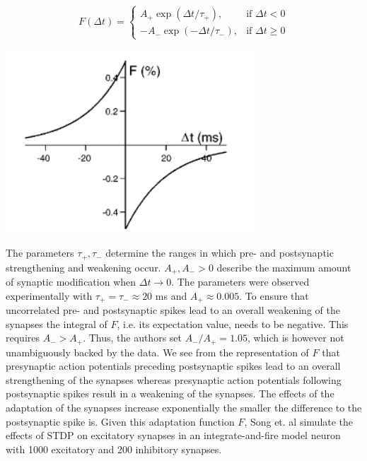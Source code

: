 \begin{minipage}{0.5\textwidth}
	$$F(\Delta t ) = \begin{cases}
	A_+ \exp(\Delta t/\tau_+), & \text{if } \Delta t < 0 \\
	- A_- \exp(-\Delta t/\tau_-), & \text{if } \Delta t \geq 0
	\end{cases}$$
\end{minipage}
\begin{minipage}[c]{0.5\textwidth}
	\centering
	\includegraphics[width=0.7\textwidth]{CN1}
\end{minipage}
The parameters $\tau_+, \tau_-$ determine the ranges in which pre- and postsynaptic strengthening and weakening occur. $A_+, A_- >0$ describe the maximum amount of synaptic modification when $\Delta t \rightarrow 0$. The parameters were observed experimentally with $\tau_+ = \tau_- \approx  20 $ ms and $A_+ \approx 0.005$. To ensure that uncorrelated pre- and postsynaptic spikes lead to an overall weakening of the synapses the integral of $F$, i.e. its expectation value, needs to be negative. This requires $A_->A_+$. Thus, the authors set $A_-/A_+ = 1.05$, which is however not unambiguously backed by the data.
We see from the representation of $F$ that presynaptic action potentials preceding postsynaptic spikes lead to an overall strengthening of the synapses whereas presynaptic action potentials following postsynaptic spikes result in a weakening of the synapses. The effects of the adaptation of the synapses increase exponentially the smaller the difference to the postsynaptic spike is. 
\newline \newline 
Given this adaptation function $F$, Song et. al \cite{article} simulate the effects of STDP on excitatory synapses in an integrate-and-fire model neuron with 1000 excitatory and 200 inhibitory synapses.
